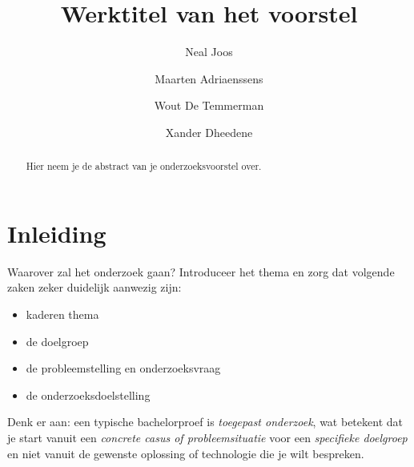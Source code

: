 \documentclass{hogent-article}
\title{Werktitel van het voorstel}
\author{Neal Joos}
\author{Maarten Adriaenssens}
\author{Wout De Temmerman}
\author{Xander Dheedene}
\begin{document}
\begin{abstract}
  Hier neem je de abstract van je onderzoeksvoorstel over.
\end{abstract}

\tableofcontents

\bigskip

%
%
%

% 
%
%
%

\section{Inleiding}%
\label{sec:inleiding}


Waarover zal het onderzoek gaan? Introduceer het thema en zorg dat volgende zaken zeker duidelijk aanwezig zijn:

\begin{itemize}
  \item kaderen thema
  \item de doelgroep
  \item de probleemstelling en onderzoeksvraag
  \item de onderzoeksdoelstelling
\end{itemize}

Denk er aan: een typische bachelorproef is \emph{toegepast onderzoek}, wat betekent dat je start vanuit een \emph{concrete casus of probleemsituatie} voor een \emph{specifieke doelgroep} en niet vanuit de gewenste oplossing of technologie die je wilt bespreken.
\end{document}
